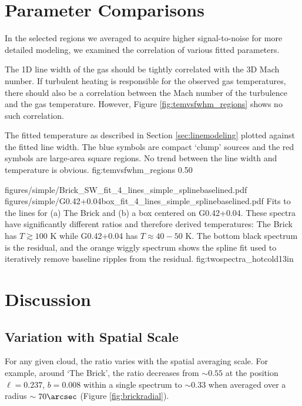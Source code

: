 \section{Parameter Comparisons}
In the selected regions we averaged to acquire higher signal-to-noise for more
detailed modeling, we examined the correlation of various fitted parameters.

The 1D line width of the gas should be tightly correlated with the 3D Mach
number.  If turbulent heating is responsible for the observed gas temperatures,
there should also be a correlation between the Mach number of the turbulence
and the gas temperature.  However, Figure \ref{fig:temvsfwhm_regions} shows no
such correlation.

{The fitted temperature as described in Section \ref{sec:linemodeling} plotted against
the fitted line width.  The blue symbols are compact `clump' sources and the red symbols
are large-area square regions.  No trend between the line width and temperature
is obvious.}
{fig:temvsfwhm_regions}
{0.5}{0}


\FigureTwo
{figures/simple/Brick_SW_fit_4_lines_simple_splinebaselined.pdf}
{figures/simple/G0.42+0.04box_fit_4_lines_simple_splinebaselined.pdf}
{Fits to the \para lines for (a) The Brick and (b) a box centered on G0.42+0.04.
These spectra have significantly different ratios and therefore derived temperatures:
The Brick has $T\gtrsim100$ K while G0.42+0.04 has $T\approx40-50$ K.
The bottom black spectrum is the residual, and the orange wiggly spectrum shows
the spline fit used to iteratively remove baseline ripples from the residual.}
{fig:twospectra_hotcold}{1}{3in}

\section{Discussion}
\subsection{Variation with Spatial Scale}
For any given cloud, the ratio \Rone varies with the spatial averaging scale.
For example, around `The Brick', the ratio decreases from $\sim0.55$ at the
position $\ell=0.237$, $b=0.008$ within a single spectrum to $\sim0.33$ when
averaged over a radius $\sim70\arcsec$ (Figure \ref{fig:brickradial}).

